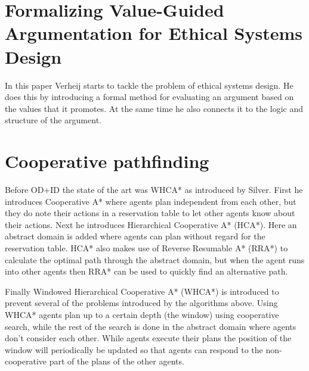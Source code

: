 \documentclass[a4paper]{article}
\begin{document}
\section{Formalizing Value-Guided Argumentation for Ethical Systems 
Design\cite{verheij2016}}
In this paper Verheij starts to tackle the problem of ethical systems design. 
He does this by introducing a formal method for evaluating an argument based on 
the values that it promotes. At the same time he also connects it to the logic 
and structure of the argument.

\section{Cooperative pathfinding\cite{silver2005}}
Before OD+ID the state of the art was WHCA* as introduced by Silver. First he 
introduces Cooperative A* where agents plan independent from each other, but 
they do note their actions in a reservation table to let other agents know 
about their actions. Next he introduces Hierarchical Cooperative A* (HCA*). 
Here an abstract domain is added where agents can plan without regard for the 
reservation table. HCA* also makes use of Reverse Resumable A* (RRA*) to 
calculate the optimal path through the abstract domain, but when the agent runs 
into other agents then RRA* can be used to quickly find an alternative path. 

Finally Windowed Hierarchical Cooperative A* (WHCA*) is introduced to prevent 
several of the problems introduced by the algorithms above. Using WHCA* agents 
plan up to a certain depth (the window) using cooperative search, while the 
rest of the search is done in the abstract domain where agents don't consider 
each other. While agents execute their plans the position of the window will 
periodically be updated so that agents can respond to the non-cooperative part 
of the plans of the other agents.

\nocite{*}


\end{document}
